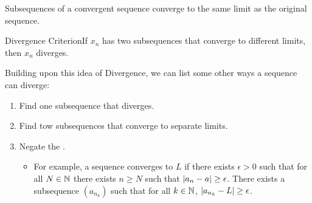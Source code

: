 \begin{theorem}
    Subsequences of a convergent sequence converge to the same limit as the original sequence.
\end{theorem}


\begin{ntheorem}
    {Divergence Criterion}If \(x_n\) has two subsequences that converge to different limits, then \(x_n\) diverges.
\end{ntheorem}

Building upon this idea of Divergence, we can list some other ways a sequence can diverge:
\begin{enumerate}
    \item Find one subsequence that diverges.
    \item Find tow subsequences that converge to separate limits.
    \item Negate the .
          \begin{itemize}
              \item For example, a sequence converges to \(L\) if there exists \(\epsilon > 0\) such that for all \(N \in \mathbb{N}\) there exists \(n \geq N\) such that \(\left|a_n - a\right| \geq \epsilon\). There exists a subsequence \((a_{n_k})\) such that for all \(k \in \mathbb{N}\), \(\left|a_{n_k} - L\right| \geq \epsilon\).
          \end{itemize}
\end{enumerate}


